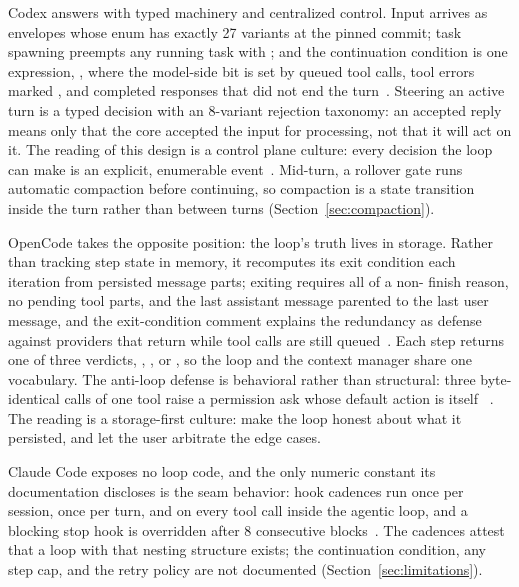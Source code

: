 \documentclass{article}
\newcommand{\codex}[0]{Codex}
\newcommand{\occ}[0]{OpenCode}
\newcommand{\ccc}[0]{Claude Code}
\begin{document}
\codex{} answers with typed machinery and centralized control. Input
arrives as  envelopes whose  enum has exactly 27
variants at the pinned commit; task spawning preempts any running task
with ; and the continuation condition is
one expression, , where the model-side bit is set by queued tool calls,
tool errors marked , and completed responses that did
not end the turn~\citep{codexRepo}. Steering an active turn is a typed
decision with an 8-variant rejection taxonomy: an accepted reply means
only that the core accepted the input for processing, not that it will
act on it. The reading of this design is a control plane culture: every
decision the loop can make is an explicit, enumerable
event~\citep{codexRepo}. Mid-turn, a rollover gate runs automatic
compaction before continuing, so compaction is a state transition inside
the turn rather than between turns (Section~\ref{sec:compaction}).

\occ{} takes the opposite position: the loop's truth lives in storage.
Rather than tracking step state in memory, it recomputes its exit
condition each iteration from persisted message parts; exiting requires
all of a non- finish reason, no pending tool parts, and
the last assistant message parented to the last user message, and the
exit-condition comment explains the redundancy as defense against
providers that return  while tool calls are still
queued~\citep{opencodeRepo}. Each step returns one of three
verdicts, , , or , so the loop
and the context manager share one vocabulary. The anti-loop defense is
behavioral rather than structural: three byte-identical calls of one tool
raise a  permission ask whose default action is itself
~\citep{opencodeRepo}. The reading is a storage-first culture:
make the loop honest about what it persisted, and let the user arbitrate
the edge cases.

\ccc{} exposes no loop code, and the only numeric constant its
documentation discloses is the seam behavior: hook cadences run once per
session, once per turn, and on every tool call inside the agentic loop,
and a blocking stop hook is overridden after 8 consecutive
blocks~\citep{claudeCodeHooksDocs}. The cadences attest that a loop with
that nesting structure exists; the continuation condition, any step cap,
and the retry policy are not documented
(Section~\ref{sec:limitations}).
\end{document}
